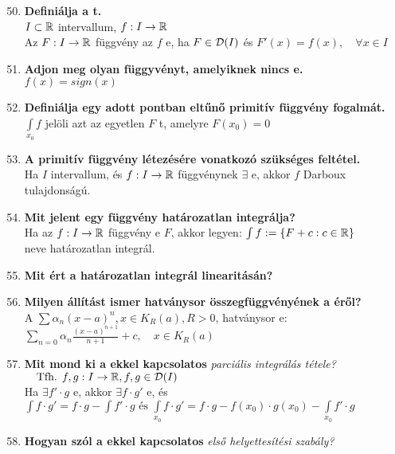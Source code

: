 \documentclass[a4paper,11pt]{article}
\begin{document}
\begin{enumerate}
	\setcounter{enumi}{49}
	\item\textbf{Definiálja a \prfv t.}\\[0.1cm]$I\subset\mathbb{R}$ intervallum, $f:I\to\mathbb{R}$\\[0.1cm]Az $F:I\to\mathbb{R}$ függvény az $f$ \prfv e, ha $F\in\mathcal{D}(I)$ és $F'(x)=f(x),\quad\forall x\in I$
	\item\textbf{Adjon meg olyan függyvényt, amelyiknek nincs \prfv e.}\\[0.1cm]$f(x)=sign(x)$
	\item\textbf{Definiálja egy adott pontban eltűnő primitív függvény fogalmát.}\\[0.1cm]$\int\limits_{x_0}f$ jelöli azt az egyetlen $F$
	\prfv t, amelyre $F(x_0)=0$
	\item\textbf{A primitív függvény létezésére vonatkozó szükséges feltétel.}\\[0.1cm]Ha $I$ intervallum, és $f:I\to\mathbb{R}$ függvénynek $\exists$ \prfv e, akkor $f$ Darboux tulajdonságú.
	\item\textbf{Mit jelent egy függvény határozatlan integrálja?}\\[0.1cm]
	Ha az $f:I\to\mathbb{R}$ függvény \prfv e $F$, akkor legyen:
	$\int f:=\{F+c:c\in\mathbb{R}\}$\\[0.1cm]neve határozatlan integrál.
	\item\textbf{Mit ért a határozatlan integrál linearitásán?}\\[0.1cm]
	\item\textbf{Milyen állítást ismer hatványsor összegfüggvényének a \prfv éről?}\\[0.1cm]
	A $\sum\alpha_n(x-a)^n,x\in K_R(a),R>0$, hatványsor \prfv e:\\[0.2cm]
	$\sum\limits_{n=0}\alpha_n\frac{(x-a)^{n+1}}{n+1}+c,\quad x\in K_R(a)$
	\newpage
	\item\textbf{Mit mond ki a \prfv ekkel kapcsolatos}
	\textit{parciális integrálás tétele?}\\[0.1cm]
	$\quad\text{Tfh. }f,g:I\to\mathbb{R},f,g\in\mathcal{D}(I)$\\[0.2cm]
	Ha $\exists f'\cdot g$ \prfv e, akkor $\exists f\cdot g'$ \prfv e, 
	és\\[0.2cm]$\int f\cdot g'=f\cdot g-\int f'\cdot g\text{ és }
	\int\limits_{x_0}f\cdot g'=	f\cdot g-f(x_0)\cdot g(x_0)-
	\int\limits_{x_0}f'\cdot g$
	\item\textbf{Hogyan szól a \prfv ekkel kapcsolatos}
	\textit{első helyettesítési szabály?}\\[0.1cm]

\end{enumerate}
\end{document}
